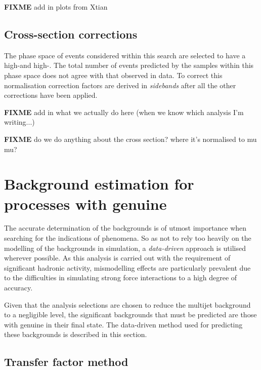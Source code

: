 {\bf FIXME} add in plots from Xtian

\subsection{Cross-section corrections}

The phase space of events considered within this search are selected
to have a high-\HT and high-\MET. The total number of events predicted
by the \MC samples within this phase space does not agree with that
observed in data. To correct this normalisation correction factors are
derived in \emph{sidebands} after all the other corrections have been
applied. 

{\bf FIXME} add in what we actually do here (when we know which
analysis I'm writing...)

{\bf FIXME} do we do anything about the \gj cross section? where it's
normalised to mu mu?

\section{Background estimation for processes with genuine \MET} %

The accurate determination of the \SM backgrounds is of utmost
importance when searching for the indications of \BSM phenomena. So as
not to rely too heavily on the modelling of the backgrounds in
simulation, a \emph{data-driven} approach is utilised wherever
possible. As this analysis is carried out with the requirement of
significant hadronic activity, mismodelling effects are particularly
prevalent due to the difficulties in simulating strong force
interactions to a high degree of accuracy.

Given that the analysis selections are chosen to reduce the \QCD
multijet background to a negligible level, the significant \SM
backgrounds that must be predicted are those with genuine \MET in
their final state. The data-driven method used for predicting these
backgrounds is described in this section.

\subsection{Transfer factor method}
\label{sec:TF}

